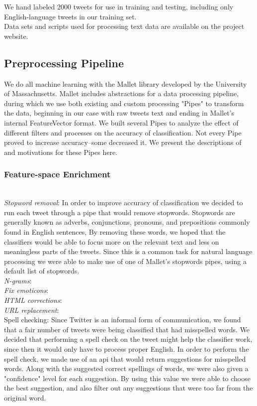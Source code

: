 \documentclass[letterpaper]{article}
\begin{document}
We hand labeled 2000 tweets for use in training and testing, including only English-language tweets in our training set. \\
Data sets and scripts used for processing text data are available on the project website.\\

\subsection{Preprocessing Pipeline}

We do all machine learning with the Mallet\cite{McCallumMALLET} library developed by the University of Massachusetts. Mallet includes abstractions for a data processing pipeline, during which we use both existing and custom processing "Pipes" to transform the data, beginning in our case with raw tweets text and ending in Mallet's internal FeatureVector format. We built several Pipes to analyze the effect of different filters and processes on the accuracy of classification. Not every Pipe proved to increase accuracy--some decreased it. We present the descriptions of and motivations for these Pipes here.

\subsubsection{Feature-space Enrichment}
~\\
\textit{Stopword removal}: In order to improve accuracy of classification we decided to run each tweet through a pipe that would remove stopwords. Stopwords are generally known as adverbs, conjunctions, pronouns, and prepositions commonly found in English sentences, By removing these words, we hoped that the classifiers would be able to focus more on the relevant text and less on meaningless parts of the tweets. Since this is a common task for natural language processing we were able to make use of one of Mallet's stopwords pipes, using a default list of stopwords.\\
\textit{N-grams}:\\
\textit{Fix emoticons}:\\
\textit{HTML corrections}:\\ 
\textit{URL replacement}:\\
Spell checking: Since Twitter is an informal form of communication, we found that a fair number of tweets were being classified that had misspelled words. We decided that performing a spell check on the tweet might help the classifier work, since then it would only have to process proper English. In order to perform the spell check, we made use of an api that would return suggestions for misspelled words. Along with the suggested correct spellings of words, we were also given a "confidence" level for each suggestion. By using this value we were able to choose the best suggestion, and also filter out any suggestions that were too far from the original word.\\
\end{document}
